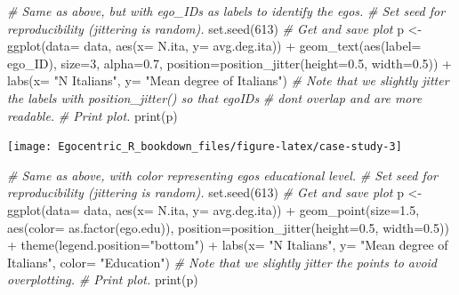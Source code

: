 \documentclass[
]{book}
\newenvironment{Shaded}{\begin{snugshade}}{\end{snugshade}}
\newcommand{\AttributeTok}[1]{\textcolor[rgb]{0.77,0.63,0.00}{#1}}
\newcommand{\CommentTok}[1]{\textcolor[rgb]{0.56,0.35,0.01}{\textit{#1}}}
\newcommand{\DecValTok}[1]{\textcolor[rgb]{0.00,0.00,0.81}{#1}}
\newcommand{\FloatTok}[1]{\textcolor[rgb]{0.00,0.00,0.81}{#1}}
\newcommand{\FunctionTok}[1]{\textcolor[rgb]{0.00,0.00,0.00}{#1}}
\newcommand{\NormalTok}[1]{#1}
\newcommand{\OtherTok}[1]{\textcolor[rgb]{0.56,0.35,0.01}{#1}}
\newcommand{\SpecialCharTok}[1]{\textcolor[rgb]{0.00,0.00,0.00}{#1}}
\newcommand{\StringTok}[1]{\textcolor[rgb]{0.31,0.60,0.02}{#1}}
\begin{document}
\begin{Shaded}
\begin{Highlighting}[]
\CommentTok{\# Same as above, but with ego\_IDs as labels to identify the egos.}
\CommentTok{\# Set seed for reproducibility (jittering is random).}
\FunctionTok{set.seed}\NormalTok{(}\DecValTok{613}\NormalTok{)}
\CommentTok{\# Get and save plot}
\NormalTok{p }\OtherTok{\textless{}{-}} \FunctionTok{ggplot}\NormalTok{(}\AttributeTok{data=}\NormalTok{ data, }\FunctionTok{aes}\NormalTok{(}\AttributeTok{x=}\NormalTok{ N.ita, }\AttributeTok{y=}\NormalTok{ avg.deg.ita)) }\SpecialCharTok{+} 
  \FunctionTok{geom\_text}\NormalTok{(}\FunctionTok{aes}\NormalTok{(}\AttributeTok{label=}\NormalTok{ ego\_ID), }\AttributeTok{size=}\DecValTok{3}\NormalTok{, }\AttributeTok{alpha=}\FloatTok{0.7}\NormalTok{, }
            \AttributeTok{position=}\FunctionTok{position\_jitter}\NormalTok{(}\AttributeTok{height=}\FloatTok{0.5}\NormalTok{, }\AttributeTok{width=}\FloatTok{0.5}\NormalTok{)) }\SpecialCharTok{+} 
  \FunctionTok{labs}\NormalTok{(}\AttributeTok{x=} \StringTok{"N Italians"}\NormalTok{, }\AttributeTok{y=} \StringTok{"Mean degree of Italians"}\NormalTok{)}
\CommentTok{\# Note that we slightly jitter the labels with position\_jitter() so that egoIDs}
\CommentTok{\# don\textquotesingle{}t overlap and are more readable.}
\CommentTok{\# Print plot.}
\FunctionTok{print}\NormalTok{(p)}
\end{Highlighting}
\end{Shaded}

\texttt{[image: Egocentric\_R\_bookdown\_files/figure-latex/case-study-3]}

\begin{Shaded}
\begin{Highlighting}[]
\CommentTok{\# Same as above, with color representing ego\textquotesingle{}s educational level.}
\CommentTok{\# Set seed for reproducibility (jittering is random).}
\FunctionTok{set.seed}\NormalTok{(}\DecValTok{613}\NormalTok{)}
\CommentTok{\# Get and save plot}
\NormalTok{p }\OtherTok{\textless{}{-}} \FunctionTok{ggplot}\NormalTok{(}\AttributeTok{data=}\NormalTok{ data, }\FunctionTok{aes}\NormalTok{(}\AttributeTok{x=}\NormalTok{ N.ita, }\AttributeTok{y=}\NormalTok{ avg.deg.ita)) }\SpecialCharTok{+} 
  \FunctionTok{geom\_point}\NormalTok{(}\AttributeTok{size=}\FloatTok{1.5}\NormalTok{, }\FunctionTok{aes}\NormalTok{(}\AttributeTok{color=} \FunctionTok{as.factor}\NormalTok{(ego.edu)), }
             \AttributeTok{position=}\FunctionTok{position\_jitter}\NormalTok{(}\AttributeTok{height=}\FloatTok{0.5}\NormalTok{, }\AttributeTok{width=}\FloatTok{0.5}\NormalTok{)) }\SpecialCharTok{+} 
  \FunctionTok{theme}\NormalTok{(}\AttributeTok{legend.position=}\StringTok{"bottom"}\NormalTok{) }\SpecialCharTok{+} 
  \FunctionTok{labs}\NormalTok{(}\AttributeTok{x=} \StringTok{"N Italians"}\NormalTok{, }\AttributeTok{y=} \StringTok{"Mean degree of Italians"}\NormalTok{, }\AttributeTok{color=} \StringTok{"Education"}\NormalTok{)}
\CommentTok{\# Note that we slightly jitter the points to avoid overplotting.}
\CommentTok{\# Print plot.}
\FunctionTok{print}\NormalTok{(p)}
\end{Highlighting}
\end{Shaded}
\end{document}
